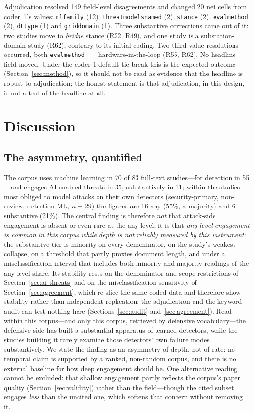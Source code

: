 \documentclass[preprint,12pt]{elsarticle}
\renewcommand{\_}{\plainunderscore\allowbreak}
\begin{document}
Adjudication resolved 149 field-level disagreements and changed 20 net cells from coder~1's
values: \texttt{ml\_family} (12), \texttt{threat\_models\_named} (2), \texttt{stance} (2),
\texttt{eval\_method} (2), \texttt{dt\_type} (1) and \texttt{grid\_domain} (1). Three substantive
corrections came out of it: two studies move to \emph{bridge} stance (R22, R49), and one
study is a substation-domain study (R62), contrary to its initial coding. Two third-value
resolutions occurred, both \texttt{eval\_method} $=$ hardware-in-the-loop (R55, R62).
No headline field moved. Under the coder-1-default tie-break this is the expected outcome
(Section~\ref{sec:method}), so it should not be read as evidence that the headline is robust
to adjudication; the honest statement is that adjudication, in this design, is not a test of
the headline at all.

\section{Discussion}\label{sec:discussion}

\subsection{The asymmetry, quantified}

The corpus uses machine learning in 70 of 83 full-text studies---for detection in 55---and
engages AI-enabled threats in 35, substantively in 11; within the studies most obliged to
model attacks on their own detectors (security-primary, non-review, detection-ML, $n=29$)
the figures are 16 any (55\%, a majority) and 6 substantive (21\%). The central finding is
therefore \emph{not} that attack-side engagement is absent or even rare at the any level;
it is that \emph{any-level engagement is common in this corpus while depth is not reliably
measured by this instrument}: the substantive tier is minority on every denominator, on
the study's weakest collapse, on a threshold that partly proxies document length, and
under a misclassification interval that includes both minority and majority readings of
the any-level share. Its stability rests on the denominator and
scope restrictions of Section~\ref{sec:ai-threats} and on the misclassification
sensitivity of Section~\ref{sec:agreement}, which re-slice the same coded data and
therefore show stability rather than independent replication; the adjudication and the
keyword audit can test nothing here (Sections~\ref{sec:audit}
and~\ref{sec:agreement}). Read
within this corpus---and only this corpus, retrieved by defensive vocabulary---the
defensive side has built a substantial
apparatus of learned detectors, while the studies building it rarely examine those
detectors' own failure modes substantively. We state the finding as an asymmetry of depth,
not of rate: no temporal claim is supported by a ranked, non-random corpus, and there
is no external baseline for how deep engagement should be. One alternative reading
cannot be excluded: that shallow engagement partly reflects the corpus's paper quality
(Section~\ref{sec:validity}) rather than the field---though the cited subset engages
\emph{less} than the uncited one, which softens that concern without removing it.
\end{document}
